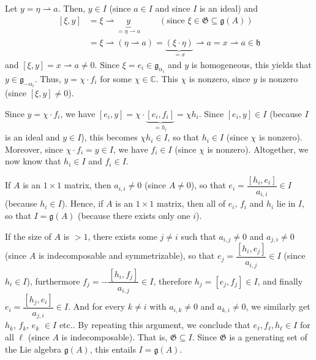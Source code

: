 \documentclass[etingof-lie.tex]{subfiles}
\begin{document}
Let $y=\eta\rightharpoonup a$. Then, $y\in I$ (since $a\in I$ and since $I$ is
an ideal) and
\begin{align*}
\left[  \xi,y\right]   &  =\xi\rightharpoonup\underbrace{y}_{=\eta
\rightharpoonup a}\ \ \ \ \ \ \ \ \ \ \left(  \text{since }\xi\in
\mathfrak{G}\subseteq\mathfrak{g}\left(  A\right)  \right) \\
&  =\xi\rightharpoonup\left(  \eta\rightharpoonup a\right)
=\underbrace{\left(  \xi\cdot\eta\right)  }_{=x}\rightharpoonup
a=x\rightharpoonup a\in\mathfrak{h}%
\end{align*}
and $\left[  \xi,y\right]  =x\rightharpoonup a\neq0$. Since $\xi=e_{i}%
\in\mathfrak{g}_{\alpha_{i}}$ and $y$ is homogeneous, this yields that
$y\in\mathfrak{g}_{-\alpha_{i}}$. Thus, $y=\chi\cdot f_{i}$ for some $\chi
\in\mathbb{C}$. This $\chi$ is nonzero, since $y$ is nonzero (since $\left[
\xi,y\right]  \neq0$).

Since $y=\chi\cdot f_{i}$, we have $\left[  e_{i},y\right]  =\chi
\cdot\underbrace{\left[  e_{i},f_{i}\right]  }_{=h_{i}}=\chi h_{i}$. Since
$\left[  e_{i},y\right]  \in I$ (because $I$ is an ideal and $y\in I$), this
becomes $\chi h_{i}\in I$, so that $h_{i}\in I$ (since $\chi$ is nonzero).
Moreover, since $\chi\cdot f_{i}=y\in I$, we have $f_{i}\in I$ (since $\chi$
is nonzero). Altogether, we now know that $h_{i}\in I$ and $f_{i}\in I$.

If $A$ is an $1\times1$ matrix, then $a_{i,i}\neq0$ (since $A\neq0$), so that
$e_{i}=\dfrac{\left[  h_{i},e_{i}\right]  }{a_{i,i}}\in I$ (because $h_{i}\in
I$). Hence, if $A$ is an $1\times1$ matrix, then all of $e_{i}$, $f_{i}$ and
$h_{i}$ lie in $I$, so that $I=\mathfrak{g}\left(  A\right)  $ (because there
exists only one $i$).

If the size of $A$ is $>1$, there exists some $j\neq i$ such that $a_{i,j}%
\neq0$ and $a_{j,i}\neq0$ (since $A$ is indecomposable and symmetrizable), so
that $e_{j}=\dfrac{\left[  h_{i},e_{j}\right]  }{a_{i,j}}\in I$ (since
$h_{i}\in I$), furthermore $f_{j}=-\dfrac{\left[  h_{i},f_{j}\right]
}{a_{i,j}}\in I$, therefore $h_{j}=\left[  e_{j},f_{j}\right]  \in I$, and
finally $e_{i}=\dfrac{\left[  h_{j},e_{i}\right]  }{a_{j,i}}\in I$. And for
every $k\neq i$ with $a_{i,k}\neq0$ and $a_{k,i}\neq0$, we similarly get
$h_{k}$, $f_{k}$, $e_{k}$ $\in I$ etc.. By repeating this argument, we
conclude that $e_{\ell},f_{\ell},h_{\ell}\in I$ for all $\ell$ (since $A$ is
indecomposable). That is, $\mathfrak{G}\subseteq I$. Since $\mathfrak{G}$ is a
generating set of the Lie algebra $\mathfrak{g}\left(  A\right)  $, this
entails $I=\mathfrak{g}\left(  A\right)  $.
\end{document}
